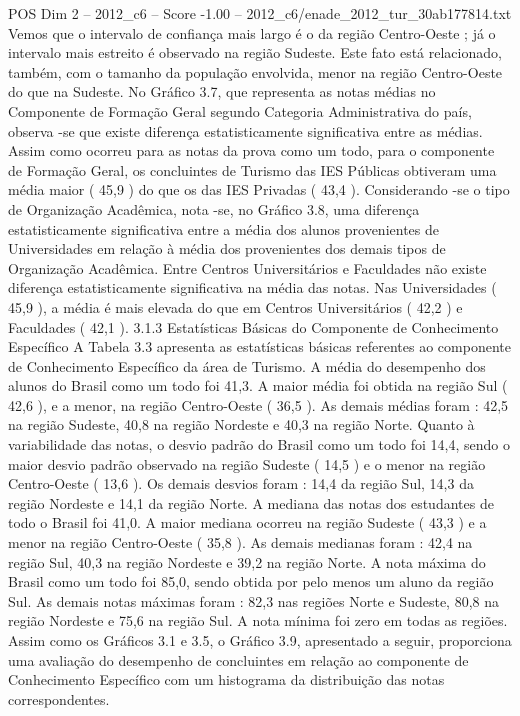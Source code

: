 \begin{textsample}{POS Dim 2 – 2012\_c6 – Score -1.00 – 2012\_c6/enade\_2012\_tur\_30ab177814.txt}
Vemos que o intervalo de confiança mais largo é o da região Centro-Oeste ; já o intervalo mais estreito é observado na região Sudeste.
Este fato está relacionado, também, com o tamanho da população envolvida, menor na região Centro-Oeste do que na Sudeste.
No Gráfico 3.7, que representa as notas médias no Componente de Formação Geral segundo Categoria Administrativa do país, observa -se que existe diferença estatisticamente significativa entre as médias.
Assim como ocorreu para as notas da prova como um todo, para o componente de Formação Geral, os concluintes de Turismo das IES Públicas obtiveram uma média maior ( 45,9 ) do que os das IES Privadas ( 43,4 ).
Considerando -se o tipo de Organização Acadêmica, nota -se, no Gráfico 3.8, uma diferença estatisticamente significativa entre a média dos alunos provenientes de Universidades em relação à média dos provenientes dos demais tipos de Organização Acadêmica.
Entre Centros Universitários e Faculdades não existe diferença estatisticamente significativa na média das notas.
Nas Universidades ( 45,9 ), a média é mais elevada do que em Centros Universitários ( 42,2 ) e Faculdades ( 42,1 ). 3.1.3 Estatísticas Básicas do Componente de Conhecimento Específico A Tabela 3.3 apresenta as estatísticas básicas referentes ao componente de Conhecimento Específico da área de Turismo.
A média do desempenho dos alunos do Brasil como um todo foi 41,3.
A maior média foi obtida na região Sul ( 42,6 ), e a menor, na região Centro-Oeste ( 36,5 ).
As demais médias foram : 42,5 na região Sudeste, 40,8 na região Nordeste e 40,3 na região Norte.
Quanto à variabilidade das notas, o desvio padrão do Brasil como um todo foi 14,4, sendo o maior desvio padrão observado na região Sudeste ( 14,5 ) e o menor na região Centro-Oeste ( 13,6 ).
Os demais desvios foram : 14,4 da região Sul, 14,3 da região Nordeste e 14,1 da região Norte.
A mediana das notas dos estudantes de todo o Brasil foi 41,0.
A maior mediana ocorreu na região Sudeste ( 43,3 ) e a menor na região Centro-Oeste ( 35,8 ).
As demais medianas foram : 42,4 na região Sul, 40,3 na região Nordeste e 39,2 na região Norte.
A nota máxima do Brasil como um todo foi 85,0, sendo obtida por pelo menos um aluno da região Sul.
As demais notas máximas foram : 82,3 nas regiões Norte e Sudeste, 80,8 na região Nordeste e 75,6 na região Sul.
A nota mínima foi zero em todas as regiões.
Assim como os Gráficos 3.1 e 3.5, o Gráfico 3.9, apresentado a seguir, proporciona uma avaliação do desempenho de concluintes em relação ao componente de Conhecimento Específico com um histograma da distribuição das notas correspondentes.

\end{textsample}
